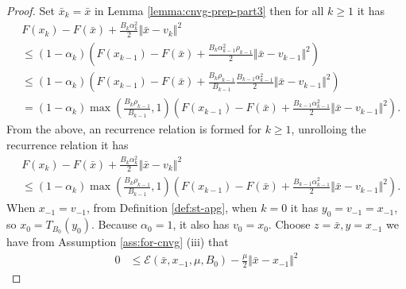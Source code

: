 \documentclass[12pt]{article}
\begin{document}
        \begin{proof}
            Set $\bar x_k = \bar x$ in Lemma \ref{lemma:cnvg-prep-part3} then for all $k\ge 1$ it has 
            \begin{align*}
                & F(x_k) - F(\bar x) + \frac{B_k\alpha_k^2}{2}\Vert \bar x- v_k\Vert^2 
                \\
                &\le \left(
                    1 - \alpha_k
                \right)\left(
                    F(x_{k- 1}) - F(\bar x) + \frac{B_k\alpha_{k -1}^2 \rho_{k - 1}}{2}\Vert \bar x - v_{k - 1}\Vert^2
                \right)
                \\
                &\le \left(
                    1 - \alpha_k
                \right)\left(
                    F(x_{k- 1}) - F(\bar x) + 
                    \frac{B_k\rho_{k - 1}}{B_{k - 1}}\frac{B_{k - 1}\alpha_{k -1}^2}{2}\Vert \bar x - v_{k - 1}\Vert^2
                \right)
                \\
                &= \left(
                    1 - \alpha_k
                \right)\max\left(
                    \frac{B_k\rho_{k - 1}}{B_{k - 1}}, 1
                \right)
                \left(
                    F(x_{k- 1}) - F(\bar x) + 
                    \frac{B_{k - 1}\alpha_{k -1}^2 }{2}\Vert \bar x - v_{k - 1}\Vert^2
                \right). 
            \end{align*}
            From the above, an recurrence relation is formed for $k \ge 1$, unrolloing the recurrence relation it has 
            \begin{align*}
                & F(x_k) - F(\bar x) + \frac{B_k\alpha_k^2}{2}\Vert \bar x- v_k\Vert^2 
                \\
                &\le 
                \left(
                    1 - \alpha_k
                \right)\max\left(
                    \frac{B_k\rho_{k - 1}}{B_{k - 1}}, 1
                \right)
                \left(
                    F(x_{k- 1}) - F(\bar x) + 
                    \frac{B_{k - 1}\alpha_{k -1}^2 }{2}\Vert \bar x - v_{k - 1}\Vert^2
                \right). 
            \end{align*}
            When $x_{-1} = v_{-1}$, from Definition \ref{def:st-apg}, when $k = 0$ it has $y_0 = v_{-1} = x_{-1}$, so $x_0 = T_{B_0}(y_0)$. 
            Because $\alpha_0 = 1$, it also has $v_0 = x_0$. 
            Choose $z = \bar x, y = x_{-1}$ we have from Assumption \ref{ass:for-cnvg} (iii) that
            \begin{align*}
                0 &\le \mathcal E(\bar x, x_{-1}, \mu, B_0) - \frac{\mu}{2}\Vert \bar x - x_{-1}\Vert^2

\end{align*}
\end{proof}
\end{document}

